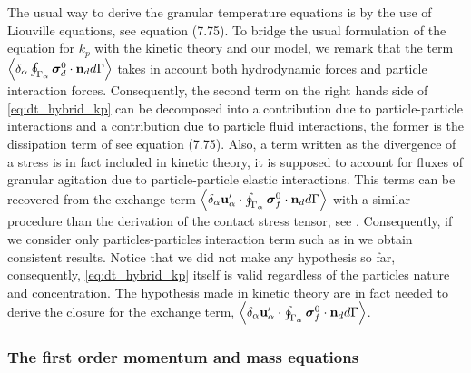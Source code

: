 The usual way to derive the granular temperature equations is by the use of Liouville equations, see \citet[Chapter 7 and 9]{rao2008introduction} equation (7.75). 
To bridge the usual formulation of the equation for $k_p$ with the kinetic theory and our model, we remark that the term $\left<\delta_\alpha \oint_{\Gamma_{\alpha}} \bm{\sigma}_d^0 \cdot \textbf{n}_d d\Gamma\right>$ takes in account both hydrodynamic forces and particle interaction forces. 
Consequently, the second term on the right hands side of \ref{eq:dt_hybrid_kp} can be decomposed into a contribution due to particle-particle interactions and a contribution due to particle fluid interactions, the former is the dissipation term of see \citet[Chapter 7 and 9]{rao2008introduction} equation (7.75). 
Also, a term written as the divergence of a stress is in fact included in kinetic theory, it is supposed to account for fluxes of granular agitation due to particle-particle elastic interactions. 
This terms can be recovered from the exchange term $\left<\delta_\alpha \textbf{u}_\alpha'\cdot\oint_{\Gamma_{\alpha}} \bm{\sigma}_f^0 \cdot \textbf{n}_d d\Gamma\right>$ with a similar procedure than the derivation of the contact stress tensor, see \citet{scorsim2021particle}. 
Consequently, if we consider only particles-particles interaction term such as in \citet{rao2008introduction} we obtain consistent results. 
Notice that we did not make any hypothesis so far, consequently, \ref{eq:dt_hybrid_kp} itself is valid regardless of the particles nature and concentration.
The hypothesis made in kinetic theory are in fact needed to derive the closure for the exchange term, $\left<\delta_\alpha \textbf{u}_\alpha'\cdot\oint_{\Gamma_{\alpha}} \bm{\sigma}_f^0 \cdot \textbf{n}_d d\Gamma\right>$. 

\subsubsection{The first order momentum and mass equations}

